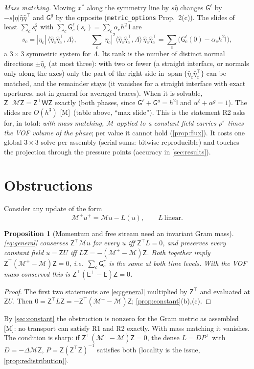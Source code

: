 \documentclass[11pt,a4paper]{article}
\newtheorem{proposition}{Proposition}
\newcommand{\meas}{\textsf{[M]}}
\newcommand{\code}[1]{\texttt{#1}}
\newcommand{\liq}{\ell}
\newcommand{\gas}{g}
\newcommand{\MM}{\mathcal M}
\newcommand{\W}{\mathsf W}
\newcommand{\E}{\mathsf E}
\newcommand{\Z}{\mathsf Z}
\newcommand{\G}{\mathsf G}
\begin{document}
\emph{Mass matching.} Moving $x^*$ along the symmetry line by $s\hat\eta$ changes
$\G^\liq$ by $-s|\eta|\hat\eta\hat\eta^\top$ and $\G^\gas$ by the opposite
(\code{metric\_options} Prop.~2(c)).  The slides of least $\sum_cs_c^2$ with
$\sum_c\G^\liq_c(s_c)=\sum_c\alpha_ch^2\,\mathsf I$ are
\begin{equation}\label{eq:match}
  s_c=|\eta_c|\,\langle\hat\eta_c\hat\eta_c^\top,\Lambda\rangle,\qquad
  \sum_c|\eta_c|^2\langle\hat\eta_c\hat\eta_c^\top,\Lambda\rangle\,\hat\eta_c\hat\eta_c^\top
  =\sum_c\bigl(\G^\liq_c(0)-\alpha_ch^2\mathsf I\bigr),
\end{equation}
a $3\times3$ symmetric system for $\Lambda$.  Its rank is the number of distinct normal
directions $\pm\hat\eta_c$ (at most three): with two or fewer (a straight interface, or normals
only along the axes) only the part of the right side in $\operatorname{span}\{\hat\eta_c\hat\eta_c^\top\}$
can be matched, and the remainder stays (it vanishes for a straight interface with exact
apertures, not in general for averaged traces).  When it is solvable, $\Z^\top\MM\Z=\Z^\top\W\Z$
exactly (both phases, since
$\G^\liq+\G^\gas=h^2\mathsf I$ and $\alpha^\liq+\alpha^\gas=1$).  The slides are $O(h^3)$
\meas\ (table above, ``max slide'').  This is the statement R2 asks for, in total: \emph{with
mass matching, $\MM$ applied to a constant field carries $\rho^\pi$ times the VOF volume of
the phase}; per value it cannot hold (\cref{prop:flux}).  It costs one global $3\times3$
solve per assembly (serial sums: bitwise reproducible) and touches the projection through
the pressure points (accuracy in \cref{sec:results}).

\section{Obstructions}\label{sec:obstruction}
Consider any update of the form
\begin{equation}\label{eq:general}
  \MM^+u^+=\MM u-L(u),\qquad L\ \text{linear}.
\end{equation}
\begin{proposition}[Momentum and free stream need an invariant Gram mass]\label{prop:obstruction}
\eqref{eq:general} conserves $\Z^\top\MM u$ for every $u$ iff $\Z^\top L=0$, and preserves
every constant field $u=\Z U$ iff $L\Z=-(\MM^+-\MM)\Z$.  Both together imply
$\Z^\top(\MM^+-\MM)\Z=0$, i.e.\ $\sum_c\G^\pi_c$ is the same at both time levels.  With the
VOF mass conserved this is $\Z^\top(\E^+-\E)\Z=0$.
\end{proposition}
\begin{proof}
The first two statements are \eqref{eq:general} multiplied by $\Z^\top$ and evaluated at
$\Z U$.  Then $0=\Z^\top L\Z=-\Z^\top(\MM^+-\MM)\Z$; \cref{prop:constant}(b),(c).
\end{proof}
By \cref{sec:constant} the obstruction is nonzero for the Gram metric as assembled
\meas: no transport can satisfy R1 and R2 exactly.  With mass matching it vanishes.  The
condition is sharp: if $\Z^\top(\MM^+-\MM)\Z=0$, the dense $L=DP^\top$ with $D=-\Delta\MM\Z$,
$P=\Z(\Z^\top\Z)^{-1}$ satisfies both (locality is the issue, \cref{prop:redistribution}).
\end{document}
